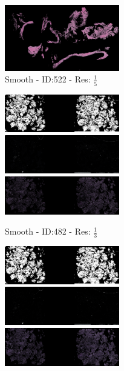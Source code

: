 \documentclass[letterpaper,10pt,oneside]{article}
\begin{document}
\begin{figure}[hbtp]
\begin{subfigure}[b]{5cm}
    \includegraphics[width=5cm]{visualization/results/smoothhistogram/res_reduce_5/Region_1_PO13-00522A1_1_2_201305171639.png}
    \caption{Smooth - ID:522 - Res: $\frac{1}{5}$}
  \end{subfigure}
  \begin{subfigure}[b]{5cm}
    \includegraphics[width=5cm]{visualization/results/smoothhistogram/res_reduce_3/Region_0_PO14-00482B3_1_2_201404171123.png}
    \includegraphics[width=5cm]{visualization/results/smoothhistogram/res_reduce_3/Region_1_PO14-00482B3_1_2_201404171123.png}
    \includegraphics[width=5cm]{visualization/results/smoothhistogram/res_reduce_3/Region_2_PO14-00482B3_1_2_201404171123.png}
    \caption{Smooth - ID:482 - Res: $\frac{1}{3}$}
  \end{subfigure}
  \begin{subfigure}[b]{5cm}
    \includegraphics[width=5cm]{visualization/results/smoothhistogram/res_reduce_4/Region_0_PO14-00482B3_1_2_201404171123.png}
    \includegraphics[width=5cm]{visualization/results/smoothhistogram/res_reduce_4/Region_1_PO14-00482B3_1_2_201404171123.png}
    \includegraphics[width=5cm]{visualization/results/smoothhistogram/res_reduce_4/Region_2_PO14-00482B3_1_2_201404171123.png}

\end{subfigure}
\end{figure}
\end{document}
